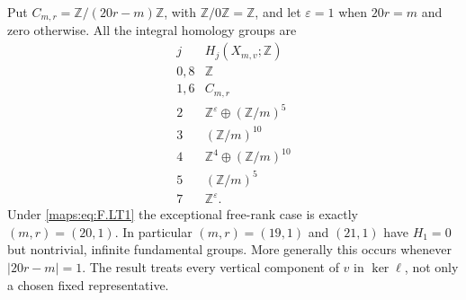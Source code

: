 \begin{theorem}
Put $C_{m,r}=\mathbb Z/(20r-m)\mathbb Z$, with
$\mathbb Z/0\mathbb Z=\mathbb Z$, and let
$\varepsilon=1$ when $20r=m$ and zero otherwise.
All the integral homology groups are
\[
\begin{array}{c|c}
j&H_j(X_{m,v};\mathbb Z)\\ \hline
0,8&\mathbb Z\\
1,6&C_{m,r}\\
2&\mathbb Z^\varepsilon\oplus(\mathbb Z/m)^5\\
3&(\mathbb Z/m)^{10}\\
4&\mathbb Z^4\oplus(\mathbb Z/m)^{10}\\
5&(\mathbb Z/m)^5\\
7&\mathbb Z^\varepsilon .
\end{array}
\tag{F.LT3}\label{maps:eq:F.LT3}
\]
Under \eqref{maps:eq:F.LT1} the exceptional free-rank case is exactly
$(m,r)=(20,1)$.
In particular $(m,r)=(19,1)$ and $(21,1)$ have
$H_1=0$ but nontrivial, infinite fundamental groups.
More generally this occurs whenever $|20r-m|=1$.
The result treats every vertical component of $v$
in $\ker\ell$, not only a chosen fixed representative.

\end{theorem}


